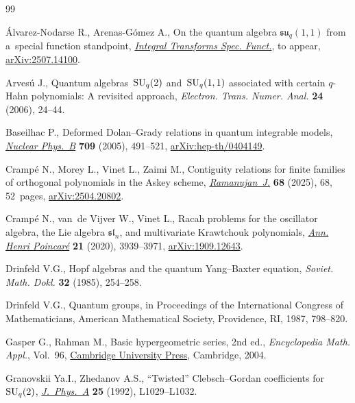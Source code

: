\begin{thebibliography}{99}
\footnotesize\itemsep=0pt

{\'A}lvarez-Nodarse R., Arenas-G\'omez A., On the quantum algebra
 $\mathfrak{su}_q(1,1)$ from a~special function standpoint,
 \href{https://doi.org/10.1080/10652469.2025.2579756}{\textit{Integral
 Transforms Spec. Funct.}}, {t}o appear,
 \href{http://arxiv.org/abs/2507.14100}{arXiv:2507.14100}.

Arves\'u J., Quantum algebras~{${\rm SU}_q(2)$} and~{${\rm SU}_q(1,1)$}
 associated with certain {$q$}-{H}ahn polynomials: {A} revisited approach,
 \textit{Electron. Trans. Numer. Anal.} \textbf{24} (2006), 24--44.

Baseilhac P., Deformed {D}olan--{G}rady relations in quantum integrable models,
 \href{https://doi.org/10.1016/j.nuclphysb.2004.12.016}{\textit{Nuclear
 Phys.~B}} \textbf{709} (2005), 491--521,
 \href{http://arxiv.org/abs/hep-th/0404149}{arXiv:hep-th/0404149}.

Cramp\'e N., Morey L., Vinet L., Zaimi M., Contiguity relations for finite
 families of orthogonal polynomials in the {A}skey scheme,
 \href{https://doi.org/10.1007/s11139-025-01229-w}{\textit{Ramanujan~J.}}
 \textbf{68} (2025), 68, 52~pages,
 \href{http://arxiv.org/abs/2504.20802}{arXiv:2504.20802}.

Cramp\'e N., van~de Vijver W., Vinet L., Racah problems for the oscillator
 algebra, the {L}ie algebra {$\mathfrak{sl}_n$}, and multivariate {K}rawtchouk
 polynomials, \href{https://doi.org/10.1007/s00023-020-00972-8}{\textit{Ann.
 Henri Poincar\'e}} \textbf{21} (2020), 3939--3971,
 \href{http://arxiv.org/abs/1909.12643}{arXiv:1909.12643}.

Drinfeld V.G., Hopf algebras and the quantum {Y}ang--{B}axter equation,
 \textit{Soviet. Math. Dokl.} \textbf{32} (1985), 254--258.

Drinfeld V.G., Quantum groups, in Proceedings of the {I}nternational {C}ongress
 of {M}athematicians, American Mathematical Society, Providence, RI, 1987,
 798--820.

Gasper G., Rahman M., Basic hypergeometric series, 2nd ed., \textit{Encyclopedia Math.
 Appl.}, Vol.~96,
 \href{https://doi.org/10.1017/CBO9780511526251}{Cambridge University Press},
 Cambridge, 2004.

Granovskii Ya.I., Zhedanov A.S., ``{T}wisted'' {C}lebsch--{G}ordan coefficients
 for~{${\rm SU}_q(2)$},
 \href{https://doi.org/10.1088/0305-4470/25/17/002}{\textit{J.~Phys.~A}}
 \textbf{25} (1992), L1029--L1032.


\end{thebibliography}
